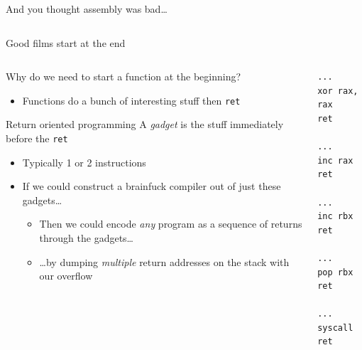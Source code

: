 \documentclass[9pt,aspectratio=169]{beamer}
\begin{document}
\begin{frame}[label={sec:org30a206b},fragile]{And you thought assembly was bad\ldots{}}
\begin{columns}
\begin{column}[t]{0.2\columnwidth}
\begin{center}
\end{center}
\end{column}
\end{columns}
\end{frame}

\begin{frame}[label={sec:orgc4774e3},fragile]{Good films start at the end}
 \begin{columns}
\begin{column}[t]{0.49\columnwidth}
Why do we need to start a function at the beginning?
\begin{itemize}
\item Functions do a bunch of interesting stuff then \texttt{ret}
\end{itemize}

\begin{block}{Return oriented programming}
A \emph{gadget} is the stuff immediately before the \texttt{ret}
\begin{itemize}
\item Typically 1 or 2 instructions
\item If we could construct a brainfuck compiler out of just these gadgets\ldots{}
\begin{itemize}
\item Then we could encode \emph{any} program as a sequence of returns through the gadgets\ldots{}
\item \ldots{}by dumping \emph{multiple} return addresses on the stack with our overflow
\end{itemize}
\end{itemize}
\end{block}
\end{column}

\begin{column}[t]{0.49\columnwidth}
\begin{verbatim}
...
xor rax, rax
ret

...
inc rax
ret

...
inc rbx
ret

...
pop rbx
ret

...
syscall
ret
\end{verbatim}
\end{column}
\end{columns}
\end{frame}
\end{document}
